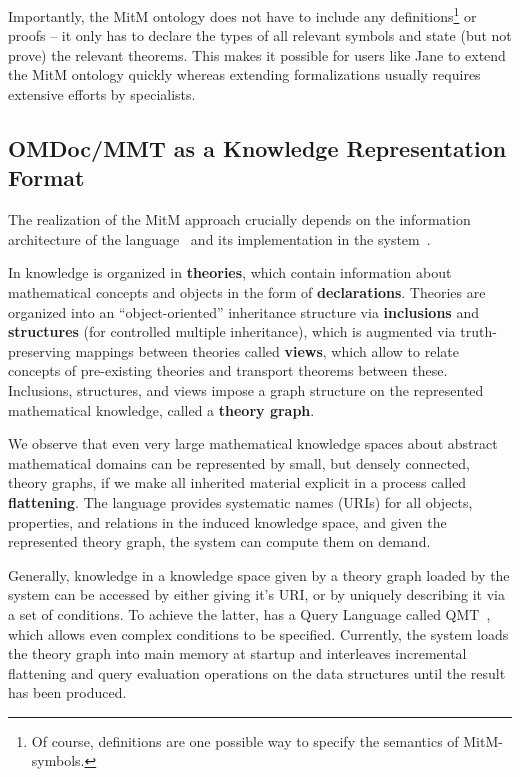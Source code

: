 Importantly, the MitM ontology does not have to include any definitions\footnote{Of course, definitions are one possible way to specify the semantics of MitM-symbols.} or proofs -- it only has to declare the types of all relevant symbols and state (but not prove) the relevant theorems.
This makes it possible for users like Jane to extend the MitM ontology quickly whereas
extending formalizations usually requires extensive efforts by specialists.

\subsection{OMDoc/MMT as a Knowledge Representation Format}\label{sec:ommt}
The realization of the MitM approach crucially depends on the information architecture of
the \ommt language~\cite{Kohlhase:OMDoc1.2,RabKoh:WSMSML13} and its implementation in the
\mmt system~\cite{Rabe:MAGMS13,uniformal:on}.

In \ommt knowledge is organized in \textbf{theories}, which contain information about
mathematical concepts and objects in the form of \textbf{declarations}. Theories are
organized into an ``object-oriented'' inheritance structure via \textbf{inclusions} and
\textbf{structures} (for controlled multiple inheritance), which is augmented via
truth-preserving mappings between theories called \textbf{views}, which allow to relate
concepts of pre-existing theories and transport theorems between these. Inclusions,
structures, and views impose a graph structure on the represented mathematical knowledge,
called a \textbf{theory graph}. 

We observe that even very large mathematical knowledge spaces about abstract mathematical
domains can be represented by small, but densely connected, theory graphs, if we make all
inherited material explicit in a process called \textbf{flattening}. The \ommt language
provides systematic names (\mmt URIs) for all objects, properties, and relations in the
induced knowledge space, and given the represented theory graph, the \mmt system can
compute them on demand. 

Generally, knowledge in a knowledge space given by a theory graph loaded by the \mmt system can be accessed by either giving it's \mmt URI, or by uniquely describing it via a set of conditions. 
To achieve the latter, \mmt has a Query Language called QMT~\cite{Rabe:qlfml12}, which allows even complex conditions to be specified. 
Currently, the \mmt system loads the theory graph into main memory at startup and interleaves incremental flattening and query evaluation operations on the \mmt data structures until the result has been produced. 

